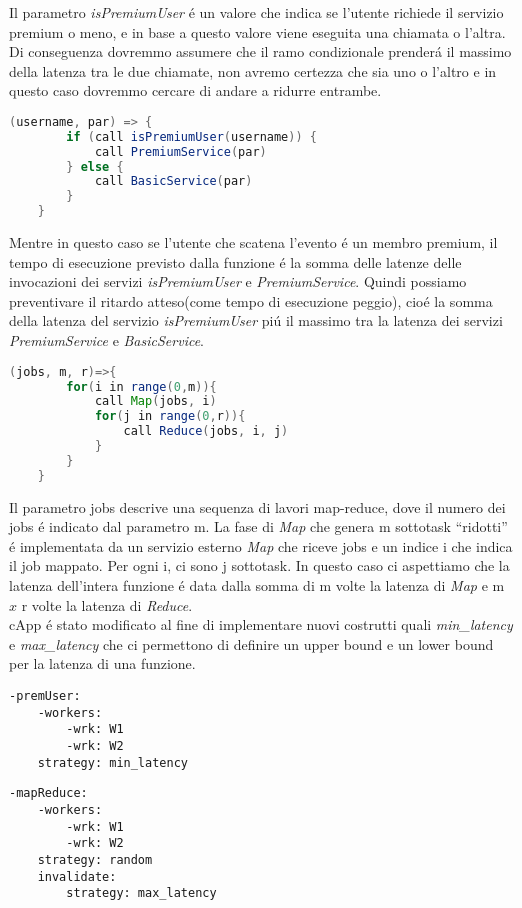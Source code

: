 \documentclass[../main.tex]{subfiles}
\begin{document}
Il parametro \textit{isPremiumUser} é un valore che indica se l'utente richiede il servizio premium o meno, e in base a questo valore viene eseguita una chiamata o l'altra.
Di conseguenza dovremmo assumere che il ramo condizionale prenderá il massimo della latenza tra le due chiamate, non avremo certezza che sia uno o l'altro e in questo caso dovremmo cercare di andare a ridurre entrambe.
\begin{lstlisting}[language=Java, caption= La guardia della condizione é un'invocazione a un servizio esterno,label={lst:2}]
    (username, par) => {
        if (call isPremiumUser(username)) {
            call PremiumService(par)
        } else {
            call BasicService(par)
        }
    }
\end{lstlisting}
Mentre in questo caso se l'utente che scatena l'evento é un membro premium, il tempo di esecuzione previsto dalla funzione é la somma delle latenze delle invocazioni dei servizi \textit{isPremiumUser} e \textit{PremiumService}.
Quindi possiamo preventivare il ritardo atteso(come tempo di esecuzione peggio), cioé la somma della latenza del servizio \textit{isPremiumUser} piú il massimo tra la latenza dei servizi \textit{PremiumService} e \textit{BasicService}.

\begin{lstlisting}[language=Java, caption=Funzione con logica Map-Reduce,label={lst:3}]
    (jobs, m, r)=>{
        for(i in range(0,m)){
            call Map(jobs, i)
            for(j in range(0,r)){
                call Reduce(jobs, i, j)
            }
        }
    }
\end{lstlisting}
Il parametro jobs descrive una sequenza di lavori map-reduce, dove il numero dei jobs é indicato dal parametro m.
La fase di \textit{Map} che genera m sottotask ``ridotti'' é implementata da un servizio esterno \textit{Map} che riceve jobs e un indice i che indica il job mappato.
Per ogni i, ci sono j sottotask.
In questo caso ci aspettiamo che la latenza dell'intera funzione é data dalla somma di m volte la latenza di \textit{Map} e m $x$ r volte la latenza di \textit{Reduce}.\\

cApp é stato modificato al fine di implementare nuovi costrutti quali \textit{min\_latency} e \textit{max\_latency} che ci permettono di definire un upper bound e un lower bound per la latenza di una funzione.
\begin{multicols}{2}
    \begin{lstlisting}[caption={cAPP for Listing \ref{lst:1} e \ref{lst:2}},label={lst:4}]
-premUser:
    -workers:
        -wrk: W1
        -wrk: W2
    strategy: min_latency
    \end{lstlisting}
    \columnbreak
    \begin{lstlisting}[caption={cApp for Listing~\ref{lst:3}}, label={lst:5}]
-mapReduce:
    -workers:
        -wrk: W1
        -wrk: W2
    strategy: random
    invalidate:
        strategy: max_latency
    \end{lstlisting}
\end{multicols}
\end{document}
